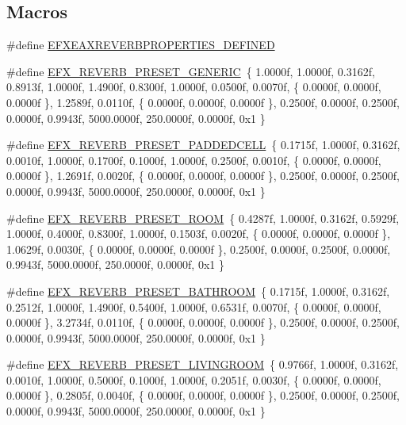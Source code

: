 \subsection*{Macros}
\begin{DoxyCompactItemize}
\item 
\#define \mbox{\hyperlink{efx-presets_8h_ace330587ef80ff1a1c4590be4a35fe86}{E\+F\+X\+E\+A\+X\+R\+E\+V\+E\+R\+B\+P\+R\+O\+P\+E\+R\+T\+I\+E\+S\+\_\+\+D\+E\+F\+I\+N\+ED}}
\item 
\#define \mbox{\hyperlink{efx-presets_8h_a30c63b1f0ea6c1dab451ead2cce9574d}{E\+F\+X\+\_\+\+R\+E\+V\+E\+R\+B\+\_\+\+P\+R\+E\+S\+E\+T\+\_\+\+G\+E\+N\+E\+R\+IC}}~\{ 1.\+0000f, 1.\+0000f, 0.\+3162f, 0.\+8913f, 1.\+0000f, 1.\+4900f, 0.\+8300f, 1.\+0000f, 0.\+0500f, 0.\+0070f, \{ 0.\+0000f, 0.\+0000f, 0.\+0000f \}, 1.\+2589f, 0.\+0110f, \{ 0.\+0000f, 0.\+0000f, 0.\+0000f \}, 0.\+2500f, 0.\+0000f, 0.\+2500f, 0.\+0000f, 0.\+9943f, 5000.\+0000f, 250.\+0000f, 0.\+0000f, 0x1 \}
\item 
\#define \mbox{\hyperlink{efx-presets_8h_a74f770d92d0a66fe01e1cb2691db14b5}{E\+F\+X\+\_\+\+R\+E\+V\+E\+R\+B\+\_\+\+P\+R\+E\+S\+E\+T\+\_\+\+P\+A\+D\+D\+E\+D\+C\+E\+LL}}~\{ 0.\+1715f, 1.\+0000f, 0.\+3162f, 0.\+0010f, 1.\+0000f, 0.\+1700f, 0.\+1000f, 1.\+0000f, 0.\+2500f, 0.\+0010f, \{ 0.\+0000f, 0.\+0000f, 0.\+0000f \}, 1.\+2691f, 0.\+0020f, \{ 0.\+0000f, 0.\+0000f, 0.\+0000f \}, 0.\+2500f, 0.\+0000f, 0.\+2500f, 0.\+0000f, 0.\+9943f, 5000.\+0000f, 250.\+0000f, 0.\+0000f, 0x1 \}
\item 
\#define \mbox{\hyperlink{efx-presets_8h_ade1399e441c36d69b5ae54171f3fc4c5}{E\+F\+X\+\_\+\+R\+E\+V\+E\+R\+B\+\_\+\+P\+R\+E\+S\+E\+T\+\_\+\+R\+O\+OM}}~\{ 0.\+4287f, 1.\+0000f, 0.\+3162f, 0.\+5929f, 1.\+0000f, 0.\+4000f, 0.\+8300f, 1.\+0000f, 0.\+1503f, 0.\+0020f, \{ 0.\+0000f, 0.\+0000f, 0.\+0000f \}, 1.\+0629f, 0.\+0030f, \{ 0.\+0000f, 0.\+0000f, 0.\+0000f \}, 0.\+2500f, 0.\+0000f, 0.\+2500f, 0.\+0000f, 0.\+9943f, 5000.\+0000f, 250.\+0000f, 0.\+0000f, 0x1 \}
\item 
\#define \mbox{\hyperlink{efx-presets_8h_a9a6ed45db903abdc2855254f72c89897}{E\+F\+X\+\_\+\+R\+E\+V\+E\+R\+B\+\_\+\+P\+R\+E\+S\+E\+T\+\_\+\+B\+A\+T\+H\+R\+O\+OM}}~\{ 0.\+1715f, 1.\+0000f, 0.\+3162f, 0.\+2512f, 1.\+0000f, 1.\+4900f, 0.\+5400f, 1.\+0000f, 0.\+6531f, 0.\+0070f, \{ 0.\+0000f, 0.\+0000f, 0.\+0000f \}, 3.\+2734f, 0.\+0110f, \{ 0.\+0000f, 0.\+0000f, 0.\+0000f \}, 0.\+2500f, 0.\+0000f, 0.\+2500f, 0.\+0000f, 0.\+9943f, 5000.\+0000f, 250.\+0000f, 0.\+0000f, 0x1 \}
\item 
\#define \mbox{\hyperlink{efx-presets_8h_a5875bf429c4a85ca8038e9977bc1eca2}{E\+F\+X\+\_\+\+R\+E\+V\+E\+R\+B\+\_\+\+P\+R\+E\+S\+E\+T\+\_\+\+L\+I\+V\+I\+N\+G\+R\+O\+OM}}~\{ 0.\+9766f, 1.\+0000f, 0.\+3162f, 0.\+0010f, 1.\+0000f, 0.\+5000f, 0.\+1000f, 1.\+0000f, 0.\+2051f, 0.\+0030f, \{ 0.\+0000f, 0.\+0000f, 0.\+0000f \}, 0.\+2805f, 0.\+0040f, \{ 0.\+0000f, 0.\+0000f, 0.\+0000f \}, 0.\+2500f, 0.\+0000f, 0.\+2500f, 0.\+0000f, 0.\+9943f, 5000.\+0000f, 250.\+0000f, 0.\+0000f, 0x1 \}

\end{DoxyCompactItemize}
